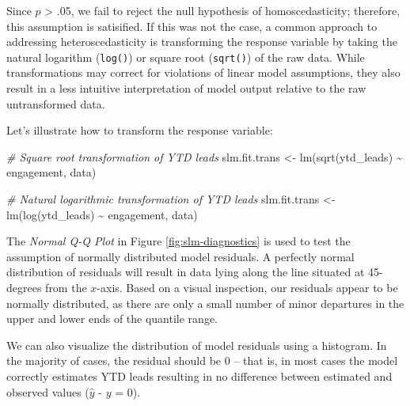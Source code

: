 \documentclass[
]{book}
\newenvironment{Shaded}{\begin{snugshade}}{\end{snugshade}}
\newcommand{\CommentTok}[1]{\textcolor[rgb]{0.56,0.35,0.01}{\textit{#1}}}
\newcommand{\FunctionTok}[1]{\textcolor[rgb]{0.00,0.00,0.00}{#1}}
\newcommand{\NormalTok}[1]{#1}
\newcommand{\OtherTok}[1]{\textcolor[rgb]{0.56,0.35,0.01}{#1}}
\newcommand{\SpecialCharTok}[1]{\textcolor[rgb]{0.00,0.00,0.00}{#1}}
\begin{document}
Since \(p\) \textgreater{} .05, we fail to reject the null hypothesis of homoscedasticity; therefore, this assumption is satisified. If this was not the case, a common approach to addressing heteroscedasticity is transforming the response variable by taking the natural logarithm (\texttt{log()}) or square root (\texttt{sqrt()}) of the raw data. While transformations may correct for violations of linear model assumptions, they also result in a less intuitive interpretation of model output relative to the raw untransformed data.

Let's illustrate how to transform the response variable:

\begin{Shaded}
\begin{Highlighting}[]
\CommentTok{\# Square root transformation of YTD leads}
\NormalTok{slm.fit.trans }\OtherTok{\textless{}{-}} \FunctionTok{lm}\NormalTok{(}\FunctionTok{sqrt}\NormalTok{(ytd\_leads) }\SpecialCharTok{\textasciitilde{}}\NormalTok{ engagement, data)}

\CommentTok{\# Natural logarithmic transformation of YTD leads}
\NormalTok{slm.fit.trans }\OtherTok{\textless{}{-}} \FunctionTok{lm}\NormalTok{(}\FunctionTok{log}\NormalTok{(ytd\_leads) }\SpecialCharTok{\textasciitilde{}}\NormalTok{ engagement, data)}
\end{Highlighting}
\end{Shaded}

The \emph{Normal Q-Q Plot} in Figure \ref{fig:slm-diagnostics} is used to test the assumption of normally distributed model residuals. A perfectly normal distribution of residuals will result in data lying along the line situated at 45-degrees from the \(x\)-axis. Based on a visual inspection, our residuals appear to be normally distributed, as there are only a small number of minor departures in the upper and lower ends of the quantile range.

We can also visualize the distribution of model residuals using a histogram. In the majority of cases, the residual should be 0 -- that is, in most cases the model correctly estimates YTD leads resulting in no difference between estimated and observed values (\(\hat{y}\) - \(y\) = 0).
\end{document}
